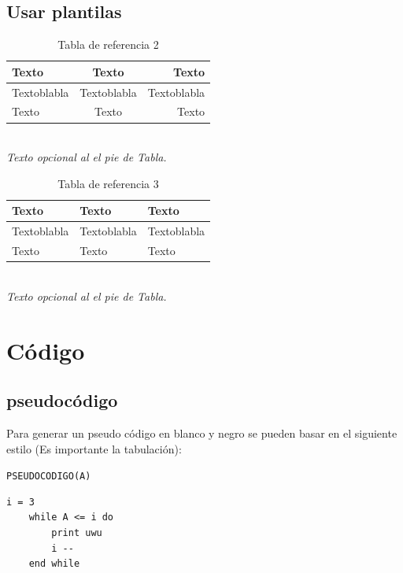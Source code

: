 \subsection{Usar plantilas}
\begin{minipage}[H]{0.49\textwidth}
    \begin{table}[H]
        \centering
        \caption{Tabla de referencia 2}
        \begin{tabular}{| l | c | r |} 
        \hline
            \textbf{Texto} & \textbf{Texto} & \textbf{Texto} \\ \hline
            Textoblabla    & Textoblabla   & Textoblabla \\ \hline
            Texto    & Texto   & Texto \\ \hline
        \end{tabular}
        \\ \textit{\scriptsize{Texto opcional al el pie de Tabla.}}
    \end{table}
\end{minipage}
\begin{minipage}[H]{0.49\textwidth}
    \begin{table}[H]
        \centering
        \caption{Tabla de referencia 3}
        \begin{tabular}{l l l}
        \toprule
            \textbf{Texto} & \textbf{Texto} & \textbf{Texto} \\
            \midrule
            Textoblabla    & Textoblabla   & Textoblabla \\
            Texto    & Texto   & Texto \\
            \bottomrule
        \end{tabular}
        \\ \textit{\scriptsize{Texto opcional al el pie de Tabla.}}
    \end{table}
\end{minipage}

\newpage
\section{Código}
\subsection{pseudocódigo}
Para generar un pseudo código en blanco y negro se pueden basar en el siguiente estilo (Es importante la tabulación):

\texttt{PSEUDOCODIGO(A)} %
\begin{lstlisting}[style=blancoynegro]
    i = 3
    while A <= i do
        print uwu
        i --
    end while
\end{lstlisting}

